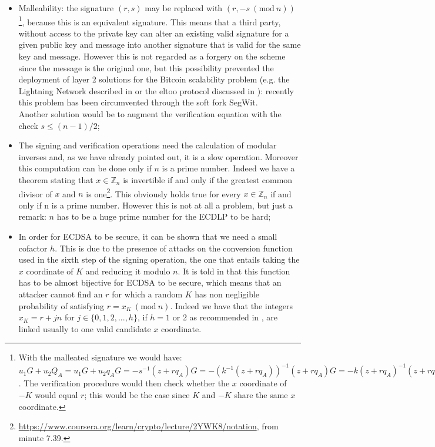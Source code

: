 \begin{itemize}
	\item Malleability: the signature $(r, s)$ may be replaced with $(r, -s \ (\text{mod} \ n))$\footnote{With the malleated signature we would have: $u_1G + u_2Q_A = u_1G + u_2q_AG = -s^{-1}(z + rq_A)G = -(k^{-1}(z + rq_A))^{-1}(z + rq_A)G = -k(z + rq_A)^{-1}(z + rq_A)G = -kG = -K$. The verification procedure would then check whether the $x$ coordinate of $-K$ would equal $r$; this would be the case since $K$ and $-K$ share the same $x$ coordinate.}, because this is an equivalent signature. This means that a third party, without access to the private key can alter an existing valid signature for a given public key and message into another signature that is valid for the same key and message. However this is not regarded as a forgery on the scheme since the message is the original one, but this possibility prevented the deployment of layer 2 solutions for the Bitcoin scalability problem (e.g. the Lightning Network described in \cite{RefWork:18} or the eltoo protocol discussed in \cite{RefWork:19}): recently this problem has been circumvented through the soft fork SegWit.
	\\
	Another solution would be to augment the verification equation with the check $s \leq (n - 1) / 2$;
	\item The signing and verification operations need the calculation of modular inverses and, as we have already pointed out, it is a slow operation. Moreover this computation can be done only if $n$ is a prime number. Indeed we have a theorem stating that $x \in \mathbb{Z}_n$ is invertible if and only if the greatest common divisor of $x$ and $n$ is one\footnote{\url{https://www.coursera.org/learn/crypto/lecture/2YWK8/notation}, from minute 7.39.}. This obviously holds true for every $x \in \mathbb{Z}_n$ if and only if n is a prime number. However this is not at all a problem, but just a remark: $n$ has to be a huge prime number for the ECDLP to be hard;
	\item In order for ECDSA to be secure, it can be shown that we need a small cofactor $h$. This is due to the presence of attacks on the conversion function used in the sixth step of the signing operation, the one that entails taking the $x$ coordinate of $K$ and reducing it modulo $n$. It is told in \cite{RefWork:2} that this function has to be almost bijective for ECDSA to be secure, which means that an attacker cannot find an $r$ for which a random $K$ has non negligible probability of satisfying $r = x_K \ (\text{mod} \ n)$. Indeed we have that the integers $x_K = r + jn$ for $j \in \{0, 1, 2, ..., h\}$, if $h = 1$ or 2 as recommended in \cite{RefWork:3}, are linked usually to one valid candidate $x$ coordinate.
\end{itemize}

